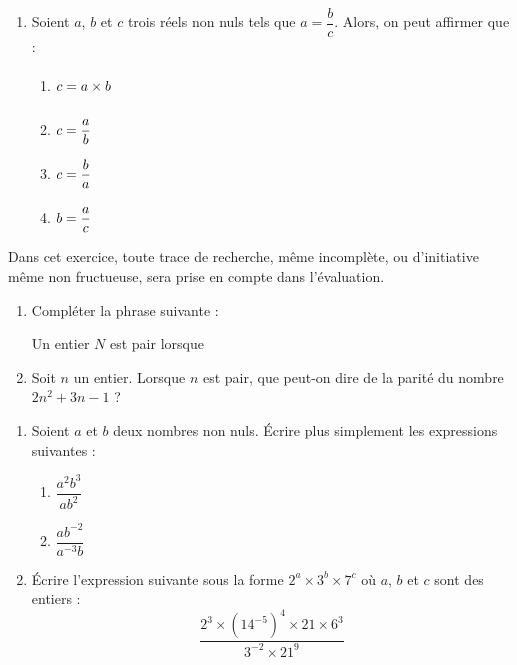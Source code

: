 \documentclass[a4paper,dvipsnames]{article}
\begin{document}
\begin{enumerate}
\begin{multicols}{4}
\begin{enumerate}
	\item $6$ est l'unique antécédent de $3$ par $f$
      \end{enumerate}
    \end{multicols}
  \item Soient $a$, $b$ et $c$ trois réels non nuls tels que $a = \dfrac{b}{c}$. Alors, on peut affirmer que :
    \begin{multicols}{4}
      \begin{enumerate}
	\item $c=a\times b\vphantom{\dfrac{b}{b}}$
	\item $c=\dfrac{a}{b}\vphantom{\dfrac{b}{b}}$
	\item $c=\dfrac{b}{a}\vphantom{\dfrac{b}{b}}$
	\item $b=\dfrac{a}{c}\vphantom{\dfrac{b}{b}}$
      \end{enumerate}
    \end{multicols}
\end{enumerate}

\bigskip

\exo[4 points] Dans cet exercice, toute trace de recherche, même incomplète, ou d'initiative même non fructueuse, sera prise en compte dans l'évaluation.

\smallskip

\begin{enumerate}
  \item Compléter la phrase suivante :
    \begin{center}
      \og{}Un entier $N$ est pair lorsque \dotfill\fg{}
    \end{center}
  \item Soit $n$ un entier. Lorsque $n$ est pair, que peut-on dire de la parité du nombre $2n^2+3n-1$ ?
\end{enumerate}

\bigskip

\exo[4 points] \vspace{-2mm}
\begin{enumerate}
  \item Soient $a$ et $b$ deux nombres non nuls. Écrire plus simplement les expressions suivantes :
    \begin{multicols}{2}
      \begin{enumerate}
	\item $\dfrac{a^2b^3}{ab^2}$
	\item $\dfrac{ab^{-2}}{a^{-3}b}$
      \end{enumerate}\columnbreak 
    \end{multicols}
    \dotfill{}
  \item Écrire l'expression suivante sous la forme $2^a\times3^b\times7^c$ où $a$, $b$ et $c$ sont des entiers :
    \[\dfrac{2^3\times\left(14^{-5}\right)^4\times21\times6^3}{3^{-2}\times21^9}\]
    \dotfill{}
\end{enumerate}
\end{document}
